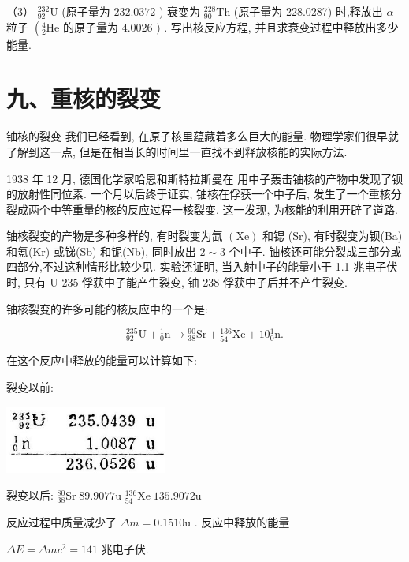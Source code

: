 \documentclass[10pt]{article}
\begin{document}
（3） \({}_{92}^{232}\mathrm{U}\) (原子量为 \({232.0372}\) ) 衰变为 \({}_{90}^{228}\mathrm{{Th}}\) (原子量为 228.0287) 时,释放出 \(\alpha\) 粒子 \(\left( {{}_{2}^{4}\mathrm{{He}}}\right.\) 的原子量为 4.0026 \()\) . 写出核反应方程, 并且求衰变过程中释放出多少能量.

\section*{九、重核的裂变}

铀核的裂变 我们已经看到, 在原子核里蕴藏着多么巨大的能量. 物理学家们很早就了解到这一点, 但是在相当长的时间里一直找不到释放核能的实际方法.

1938 年 12 月, 德国化学家哈恩和斯特拉斯曼在 用中子轰击铀核的产物中发现了钡的放射性同位素. 一个月以后终于证实, 铀核在俘获一个中子后, 发生了一个重核分裂成两个中等重量的核的反应过程一核裂变. 这一发现, 为核能的利用开辟了道路.

铀核裂变的产物是多种多样的, 有时裂变为氙 \(\left( \mathrm{{Xe}}\right)\) 和锶 (Sr), 有时裂变为钡(Ba) 和氪(Kr) 或锑(Sb) 和铌(Nb), 同时放出 \(2 \sim 3\) 个中子. 铀核还可能分裂成三部分或四部分,不过这种情形比较少见. 实验还证明, 当入射中子的能量小于 1.1 兆电子伏时, 只有 U 235 俘获中子能产生裂变, 铀 238 俘获中子后并不产生裂变.

铀核裂变的许多可能的核反应中的一个是:

\[
{}_{92}^{235}\mathrm{U} + {}_{0}^{1}\mathrm{n} \rightarrow {}_{38}^{90}\mathrm{{Sr}} + {}_{54}^{136}\mathrm{{Xe}} + {10}{}_{0}^{1}\mathrm{n}.
\]

在这个反应中释放的能量可以计算如下:

裂变以前:

\begin{center}
\includegraphics[max width=0.4\textwidth]{images/01913056-1f15-74d8-9184-9aab52c9d66b_359_109886.jpg}
\end{center}

裂变以后: \({}_{38}^{80}\mathrm{{Sr}}\;{89.9077}\mathrm{u}\) \({}_{54}^{136}\mathrm{{Xe}}\;{135.9072}\mathrm{u}\)

反应过程中质量减少了 \({\Delta m} = {0.1510}\mathrm{u}\) . 反应中释放的能量

\({\Delta E} = {\Delta m}{c}^{2} = {141}\) 兆电子伏.
\end{document}

